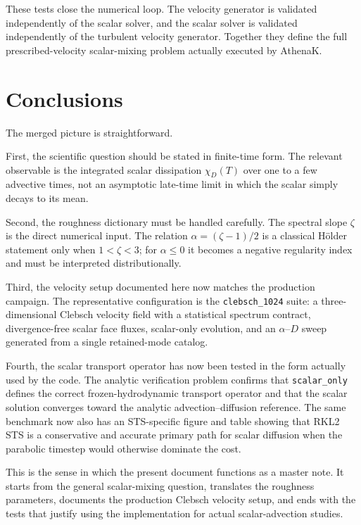 \documentclass[11pt]{article}
\newcommand{\code}[1]{\texttt{#1}}
\newcommand{\SO}{\code{scalar\_only}\xspace}
\begin{document}
These tests close the numerical loop. The velocity generator is validated independently of the scalar solver, and the scalar solver is validated independently of the turbulent velocity generator. Together they define the full prescribed-velocity scalar-mixing problem actually executed by AthenaK.

\section{Conclusions}
The merged picture is straightforward.

First, the scientific question should be stated in finite-time form. The relevant observable is the integrated scalar dissipation $\chi_D(T)$ over one to a few advective times, not an asymptotic late-time limit in which the scalar simply decays to its mean.

Second, the roughness dictionary must be handled carefully. The spectral slope $\zeta$ is the direct numerical input. The relation $\alpha=(\zeta-1)/2$ is a classical H\"older statement only when $1<\zeta<3$; for $\alpha\le 0$ it becomes a negative regularity index and must be interpreted distributionally.

Third, the velocity setup documented here now matches the production
 campaign. The representative
configuration is the \code{clebsch\_1024} suite: a three-dimensional Clebsch
velocity field with a statistical spectrum contract, divergence-free scalar
face fluxes, scalar-only evolution, and an $\alpha$--$D$ sweep generated from a
single retained-mode catalog.

Fourth, the scalar transport operator has now been tested in the form actually
used by the code. The analytic verification problem confirms that \SO defines
the correct frozen-hydrodynamic transport operator and that the scalar solution
converges toward the analytic advection--diffusion reference. The same
benchmark now also has an STS-specific figure and table showing that RKL2 STS
is a conservative and accurate primary path for scalar diffusion when the
parabolic timestep would otherwise dominate the cost.

This is the sense in which the present document functions as a master note. It starts from the general scalar-mixing question, translates the roughness parameters, documents the production Clebsch velocity setup, and ends with the tests that justify using the implementation for actual scalar-advection studies.
\end{document}
